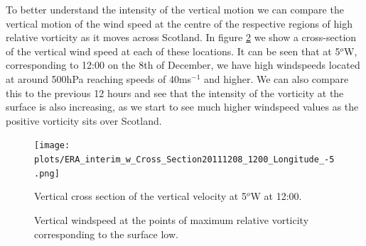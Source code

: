 \documentclass[12pt,a4paper]{article}
\begin{document}
To better understand the intensity of the vertical motion we can compare the vertical motion of the wind speed at the centre of the respective regions of high relative vorticity as it moves across Scotland. In figure \ref{vertical windspeed} we show a cross-section of the vertical wind speed at each of these locations. It can be seen that at 5$^o$W, corresponding to 12:00 on the 8th of December, we have high windspeeds located at around 500hPa reaching speeds of 40ms$^{-1}$ and higher. We can also compare this to the previous 12 hours and see that the intensity of the vorticity at the surface is also increasing, as we start to see much higher windspeed values as the positive vorticity sits over Scotland. 
\begin{figure}[H]
    \centering
    \texttt{[image: plots/ERA\_interim\_w\_Cross\_Section20111208\_1200\_Longitude\_-5.png]}
    \caption{Vertical cross section of the vertical velocity at 5$^o$W at 12:00.}
    \label{verticalcross}
\end{figure}
\begin{figure}[H]
        \centering
            \centering
            \caption{Vertical windspeed at the points of maximum relative vorticity corresponding to the surface low.}
            \label{vertical windspeed}
\end{figure}
\end{document}
